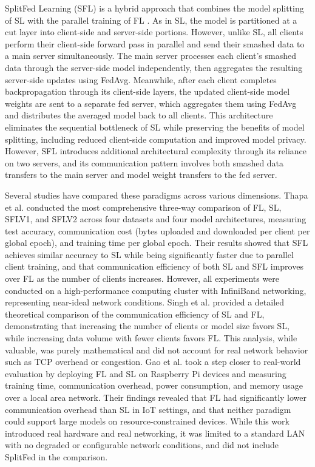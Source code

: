 \documentclass[12pt]{article}
\begin{document}
SplitFed Learning (SFL) is a hybrid approach that combines the model splitting of SL with the parallel training of FL \cite{thapa2022}. As in SL, the model is partitioned at a cut layer into client-side and server-side portions. However, unlike SL, all clients perform their client-side forward pass in parallel and send their smashed data to a main server simultaneously. The main server processes each client's smashed data through the server-side model independently, then aggregates the resulting server-side updates using FedAvg. Meanwhile, after each client completes backpropagation through its client-side layers, the updated client-side model weights are sent to a separate fed server, which aggregates them using FedAvg and distributes the averaged model back to all clients. This architecture eliminates the sequential bottleneck of SL while preserving the benefits of model splitting, including reduced client-side computation and improved model privacy. However, SFL introduces additional architectural complexity through its reliance on two servers, and its communication pattern involves both smashed data transfers to the main server and model weight transfers to the fed server.

Several studies have compared these paradigms across various dimensions. Thapa et al. \cite{thapa2022} conducted the most comprehensive three-way comparison of FL, SL, SFLV1, and SFLV2 across four datasets and four model architectures, measuring test accuracy, communication cost (bytes uploaded and downloaded per client per global epoch), and training time per global epoch. Their results showed that SFL achieves similar accuracy to SL while being significantly faster due to parallel client training, and that communication efficiency of both SL and SFL improves over FL as the number of clients increases. However, all experiments were conducted on a high-performance computing cluster with InfiniBand networking, representing near-ideal network conditions. Singh et al. \cite{singh2019} provided a detailed theoretical comparison of the communication efficiency of SL and FL, demonstrating that increasing the number of clients or model size favors SL, while increasing data volume with fewer clients favors FL. This analysis, while valuable, was purely mathematical and did not account for real network behavior such as TCP overhead or congestion. Gao et al. \cite{gao2020} took a step closer to real-world evaluation by deploying FL and SL on Raspberry Pi devices and measuring training time, communication overhead, power consumption, and memory usage over a local area network. Their findings revealed that FL had significantly lower communication overhead than SL in IoT settings, and that neither paradigm could support large models on resource-constrained devices. While this work introduced real hardware and real networking, it was limited to a standard LAN with no degraded or configurable network conditions, and did not include SplitFed in the comparison.
\end{document}
